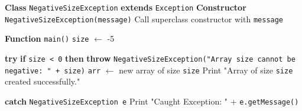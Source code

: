\begin{algorithm}[H]
\caption{Custom Exception for Negative Array Size}
\begin{algorithmic}[1]

\STATE \textbf{Class} \texttt{NegativeSizeException} \textbf{extends} \texttt{Exception}
\STATE \hspace{1em} \textbf{Constructor} \texttt{NegativeSizeException(message)}
\STATE \hspace{2em} Call superclass constructor with \texttt{message}

\STATE

\STATE \textbf{Function} \texttt{main()}
\STATE \hspace{1em} \texttt{size} $\gets$ -5  

\STATE \hspace{1em} \textbf{try}
\STATE \hspace{2em} \textbf{if} \texttt{size < 0} \textbf{then}
\STATE \hspace{3em} \textbf{throw} \texttt{NegativeSizeException("Array size cannot be negative: " + size)}
\STATE \hspace{2em} \texttt{arr} $\gets$ new array of size \texttt{size}
\STATE \hspace{2em} Print "Array of size \texttt{size} created successfully."

\STATE \hspace{1em} \textbf{catch} \texttt{NegativeSizeException e}
\STATE \hspace{2em} Print "Caught Exception: " + \texttt{e.getMessage()}

\end{algorithmic}
\end{algorithm}